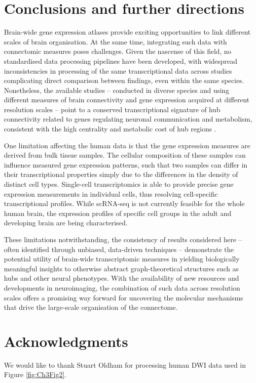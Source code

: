 \section{Conclusions and further directions}

Brain-wide gene expression atlases provide exciting opportunities to link different scales of brain organisation. At the same time, integrating such data with connectomic measures poses challenges. Given the nascense of this field, no standardised data processing pipelines have been developed, with widespread inconsistencies in processing of the same transcriptional data across \mbox{studies \citep{Arnatkeviciute2019}} complicating direct comparison between findings, even within the same species. Nonetheless, the available studies -- conducted in diverse species and using different measures of brain connectivity and gene expression acquired at different resolution scales -- point to a conserved transcriptional signature of hub connectivity related to genes regulating neuronal communication and metabolism, consistent with the high centrality and metabolic cost of hub regions \citep{Bullmore2009}.

One limitation affecting the human data is that the gene expression measures are derived from bulk tissue samples. The cellular composition of these samples can influence measured gene expression patterns, such that two samples can differ in their transcriptional properties simply due to the differences in the density of distinct cell types. Single-cell transcriptomics is able to provide precise gene expression measurements in individual cells, thus resolving cell-specific transcriptional profiles. While scRNA-seq is not currently feasible for the whole human brain, the expression profiles of specific cell groups in the adult \citep{Johnson2015a,Hu2017,Picardi2017} and developing brain \citep{Zhong2018} are being characterised.

These limitations notwithstanding, the consistency of results considered here -- often identified through unbiased, data-driven techniques -- demonstrate the potential utility of brain-wide transcriptomic measures in yielding biologically meaningful insights to otherwise abstract graph-theoretical structures such as hubs and other neural phenotypes. With the availability of new resources and developments in neuroimaging, the combination of such data across resolution scales offers a promising way forward for uncovering the molecular mechanisms that drive the large-scale organisation of the connectome.

\section*{Acknowledgments}

We would like to thank Stuart Oldham for processing human DWI data used in Figure \ref{fig:Ch3Fig2}.
